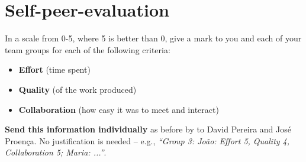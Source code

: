 \documentclass[11pt]{article}
\begin{document}





\section*{Self-peer-evaluation}
\begin{myExercise}
  In a scale from 0-5, where 5 is better than 0, give a mark to you and each of your team groups for each of the following criteria:
  \begin{itemize}
    \item \textbf{Effort} (time spent)
    \item \textbf{Quality} (of the work produced)
    \item \textbf{Collaboration} (how easy it was to meet and interact)
  \end{itemize}
  \textbf{Send this information individually} as before by to David Pereira and Jos\'{e} Proen\c{c}a. No justification is needed -- e.g., \emph{``Group 3: Jo\~{a}o: Effort 5, Quality 4, Collaboration 5; Maria: ...''}.
\end{myExercise}


 
\end{document}
